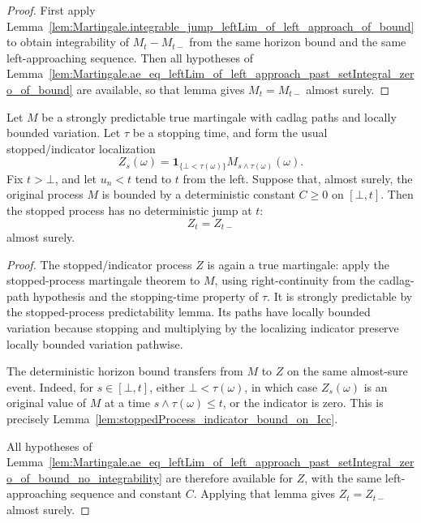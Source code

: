 \begin{proof}
First apply
Lemma~\ref{lem:Martingale.integrable_jump_leftLim_of_left_approach_of_bound}
to obtain integrability of \(M_t-M_{t-}\) from the same horizon bound and the
same left-approaching sequence.  Then all hypotheses of
Lemma~\ref{lem:Martingale.ae_eq_leftLim_of_left_approach_past_setIntegral_zero_of_bound}
are available, so that lemma gives \(M_t=M_{t-}\) almost surely.
\end{proof}

\begin{lemma}\label{lem:Martingale.ae_eq_leftLim_stoppedProcess_indicator_of_left_approach_of_bound}
Let \(M\) be a strongly predictable true martingale with cadlag paths and
locally bounded variation.  Let \(\tau\) be a stopping time, and form the
usual stopped/indicator localization
\[
  Z_s(\omega)
  =
  \mathbf 1_{\{\bot<\tau(\omega)\}}
  M_{s\wedge\tau(\omega)}(\omega).
\]
Fix \(t>\bot\), and let \(u_n<t\) tend to \(t\) from the left.  Suppose that,
almost surely, the original process \(M\) is bounded by a deterministic
constant \(C\ge0\) on \([\bot,t]\).  Then the stopped process has no
deterministic jump at \(t\):
\[
  Z_t = Z_{t-}
\]
almost surely.
\end{lemma}

\begin{proof}
The stopped/indicator process \(Z\) is again a true martingale: apply the
stopped-process martingale theorem to \(M\), using right-continuity from the
cadlag-path hypothesis and the stopping-time property of \(\tau\).  It is
strongly predictable by the stopped-process predictability lemma.  Its paths
have locally bounded variation because stopping and multiplying by the
localizing indicator preserve locally bounded variation pathwise.

The deterministic horizon bound transfers from \(M\) to \(Z\) on the same
almost-sure event.  Indeed, for \(s\in[\bot,t]\), either
\(\bot<\tau(\omega)\), in which case \(Z_s(\omega)\) is an original value of
\(M\) at a time \(s\wedge\tau(\omega)\le t\), or the indicator is zero.  This
is precisely Lemma~\ref{lem:stoppedProcess_indicator_bound_on_Icc}.

All hypotheses of
Lemma~\ref{lem:Martingale.ae_eq_leftLim_of_left_approach_past_setIntegral_zero_of_bound_no_integrability}
are therefore available for \(Z\), with the same left-approaching sequence
and constant \(C\).  Applying that lemma gives \(Z_t=Z_{t-}\) almost surely.
\end{proof}

